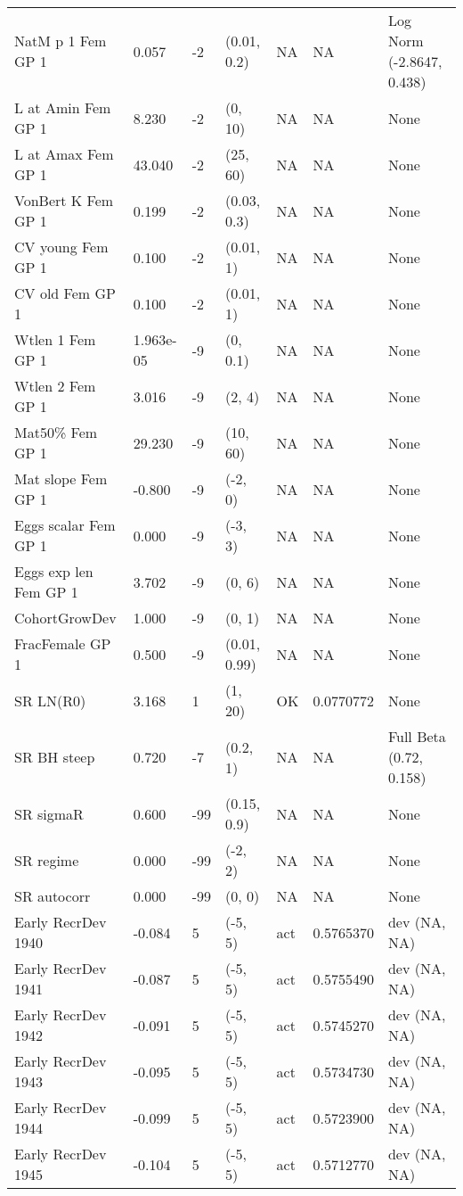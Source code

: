\documentclass[11pt,
  english,
  letterpaper,
]{article}
\begin{document}
\begin{landscape}
\begin{longtable}[t]{>{\raggedright\arraybackslash}p{6cm}lllll>{\raggedright\arraybackslash}p{4cm}}
\endfoot
\bottomrule
\endlastfoot
NatM p 1 Fem GP 1 & 0.057 & -2 & (0.01, 0.2) & NA & NA & Log Norm (-2.8647, 0.438)\\
L at Amin Fem GP 1 & 8.230 & -2 & (0, 10) & NA & NA & None\\
L at Amax Fem GP 1 & 43.040 & -2 & (25, 60) & NA & NA & None\\
VonBert K Fem GP 1 & 0.199 & -2 & (0.03, 0.3) & NA & NA & None\\
CV young Fem GP 1 & 0.100 & -2 & (0.01, 1) & NA & NA & None\\
CV old Fem GP 1 & 0.100 & -2 & (0.01, 1) & NA & NA & None\\
Wtlen 1 Fem GP 1 & 1.963e-05 & -9 & (0, 0.1) & NA & NA & None\\
Wtlen 2 Fem GP 1 & 3.016 & -9 & (2, 4) & NA & NA & None\\
Mat50\% Fem GP 1 & 29.230 & -9 & (10, 60) & NA & NA & None\\
Mat slope Fem GP 1 & -0.800 & -9 & (-2, 0) & NA & NA & None\\
Eggs scalar Fem GP 1 & 0.000 & -9 & (-3, 3) & NA & NA & None\\
Eggs exp len Fem GP 1 & 3.702 & -9 & (0, 6) & NA & NA & None\\
CohortGrowDev & 1.000 & -9 & (0, 1) & NA & NA & None\\
FracFemale GP 1 & 0.500 & -9 & (0.01, 0.99) & NA & NA & None\\
SR LN(R0) & 3.168 & 1 & (1, 20) & OK & 0.0770772 & None\\
SR BH steep & 0.720 & -7 & (0.2, 1) & NA & NA & Full Beta (0.72, 0.158)\\
SR sigmaR & 0.600 & -99 & (0.15, 0.9) & NA & NA & None\\
SR regime & 0.000 & -99 & (-2, 2) & NA & NA & None\\
SR autocorr & 0.000 & -99 & (0, 0) & NA & NA & None\\
Early RecrDev 1940 & -0.084 & 5 & (-5, 5) & act & 0.5765370 & dev (NA, NA)\\
Early RecrDev 1941 & -0.087 & 5 & (-5, 5) & act & 0.5755490 & dev (NA, NA)\\
Early RecrDev 1942 & -0.091 & 5 & (-5, 5) & act & 0.5745270 & dev (NA, NA)\\
Early RecrDev 1943 & -0.095 & 5 & (-5, 5) & act & 0.5734730 & dev (NA, NA)\\
Early RecrDev 1944 & -0.099 & 5 & (-5, 5) & act & 0.5723900 & dev (NA, NA)\\
Early RecrDev 1945 & -0.104 & 5 & (-5, 5) & act & 0.5712770 & dev (NA, NA)\\

\end{longtable}
\end{landscape}
\end{document}
